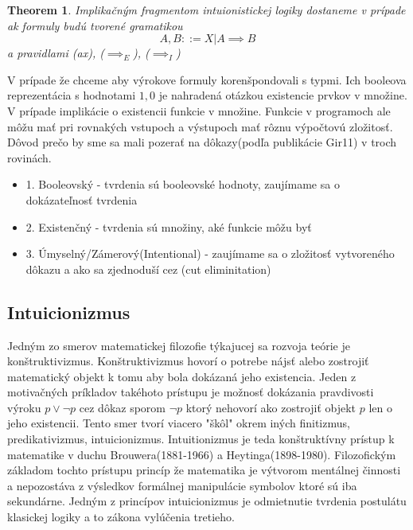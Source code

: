 \documentclass[a4paper,10pt,oneside]{report}%
\newtheorem{theorem}{Theorem}
\begin{document}
\begin{theorem}
    Implikačným fragmentom intuionistickej logiky dostaneme v prípade ak formuly
        budú tvorené gramatikou
    \begin{equation}
        A,B ::= X | A \implies B
    \end{equation}
    a pravidlami (ax), ($\implies_{E}$), ($\implies_{I}$)
\end{theorem}


V prípade že chceme aby výrokove formuly korenšpondovali s typmi.
Ich booleova reprezentácia s hodnotami $1,0$ je nahradená otázkou existencie prvkov v množine.
V prípade implikácie o existencii funkcie v množine.
Funkcie v programoch ale môžu mať pri rovnakých vstupoch a výstupoch mať rôznu výpočtovú zložitosť.
Dôvod prečo by sme sa mali pozerať na dôkazy(podľa publikácie Gir11) v troch rovinách.

\begin{itemize}
    \item 1. Booleovský - tvrdenia sú booleovské hodnoty, zaujímame sa o dokázateľnosť tvrdenia
    \item 2. Existenčný - tvrdenia sú množiny, aké funkcie môžu byť
    \item 3. Úmyselný/Zámerový(Intentional) - zaujímame sa o zložitosť vytvoreného dôkazu a ako sa zjednoduší cez (cut eliminitation)
\end{itemize}

\subsection{Intuicionizmus}

Jedným zo smerov matematickej filozofie týkajucej sa rozvoja teórie je konštruktivizmus.
Konštruktivizmus hovorí o potrebe nájsť alebo zostrojiť matematický objekt k tomu
    aby bola dokázaná jeho existencia.
Jeden z motivačných príkladov takéhoto prístupu je možnosť dokázania pravdivosti
výroku $p \vee \neg p$ cez dôkaz sporom $\neg p$ ktorý nehovorí ako zostrojiť objekt
$p$ len o jeho existencii.
Tento smer tvorí viacero "škôl" okrem iných finitizmus, predikativizmus, intuicionizmus.
Intuitionizmus je teda konštruktívny prístup k matematike v duchu
    Brouwera(1881-1966) a Heytinga(1898-1980).
Filozofickým základom tochto prístupu princíp že matematika je výtvorom mentálnej
činnosti a nepozostáva z výsledkov  formálnej manipulácie symbolov ktoré sú iba
sekundárne.
Jedným z princípov intuicionizmus je odmietnutie tvrdenia postulátu klasickej
logiky a to zákona vylúčenia tretieho.
\end{document}
